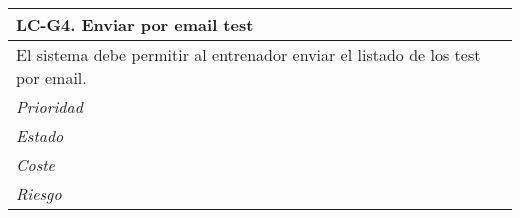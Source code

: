 	\begin{center}
		\begin{tabularx}{15cm}{|X|}
			\hline 
				\bf{LC-G4. Enviar por email test}\\
			\hline
				El sistema debe permitir al entrenador enviar el listado de los test por email.\\
			\hline
				\it{Prioridad}\\
			\hline
				\it{Estado}\\
			\hline
				\it{Coste}\\
			\hline
				\it{Riesgo}\\
			\hline
		\end{tabularx}
	\end{center}
